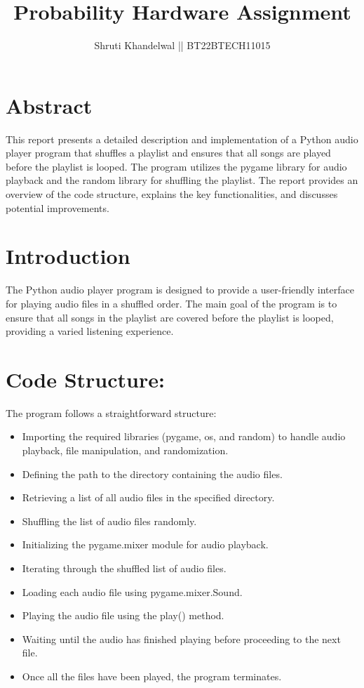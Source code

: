 \documentclass{article}
\begin{document}
\title{Probability Hardware Assignment}
\author{Shruti Khandelwal || BT22BTECH11015}
\maketitle

\section{Abstract}
This report presents a detailed description and implementation of a Python audio player program that shuffles a playlist and ensures that all songs are played before the playlist is looped. The program utilizes the pygame library for audio playback and the random library for shuffling the playlist. The report provides an overview of the code structure, explains the key functionalities, and discusses potential improvements.
\section{Introduction}
The Python audio player program is designed to provide a user-friendly interface for playing audio files in a shuffled order. The main goal of the program is to ensure that all songs in the playlist are covered before the playlist is looped, providing a varied listening experience.

\section{Code Structure:}
The program follows a straightforward structure:
\begin{itemize}
     \item Importing the required libraries (pygame, os, and random) to handle audio playback, file manipulation, and randomization.
     \item Defining the path to the directory containing the audio files.
      \item Retrieving a list of all audio files in the specified directory.
       \item Shuffling the list of audio files randomly.
      \item Initializing the pygame.mixer module for audio playback.
       \item Iterating through the shuffled list of audio files.
        \item Loading each audio file using pygame.mixer.Sound.
        \item Playing the audio file using the play() method.
        \item Waiting until the audio has finished playing before proceeding to the next file.
        \item Once all the files have been played, the program terminates.
 \end{itemize}
\end{document}
